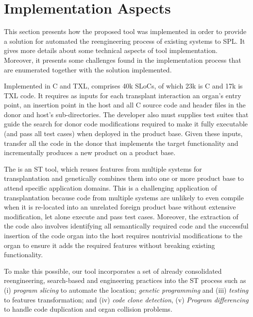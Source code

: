 \section{Implementation Aspects} 
\label{sec:implementation_aspects}

This section presents how the proposed tool was implemented in order to provide a solution for automated the reengineering process of existing systems to SPL. It gives more details about some technical aspects of \autoscalpel tool implementation. Moreover, it presents some challenges found in the implementation process that are enumerated together with the solution implemented.

Implemented in  C and TXL, \autoscalpel comprises 40k SLoCs, of which 23k is C and 17k is TXL code. It requires as inputs for each transplant interaction an organ’s entry point, an insertion point in the host and all C source code and header files in the donor and host's sub-directories. The developer also must supplies test suites that guide the search for donor code modifications required to make it fully executable (and pass all test cases) when deployed in the product base. Given these inputs, \autoscalpel transfer all the code in the donor that implements the target functionality and incrementally produces a new product on a product base. 

The \autoscalpel is an ST tool, which reuses features from multiple systems for transplantation and genetically combines them into one or more product base to attend specific application domains. This is a challenging application of transplantation because code from multiple systems are unlikely to even compile when it is re-located into an unrelated foreign product base without extensive modification, let alone execute and pass test cases. Moreover, the extraction of the code also involves identifying all semantically required code and the successful insertion of the code organ into the host requires nontrivial modifications to the organ to ensure it adds the required features without breaking existing functionality.  

To make this possible, our tool incorporates a set of already consolidated reengineering, search-based and engineering practices into the ST process such as (i) \emph{program slicing} \cite{Binkley:2014:OLP:2635868.2635893} to automate the location; \emph{genetic programming} and (iii) \emph{testing}  to features transformation; and (iv) \emph{code clone detection}, (v) \emph{Program differencing} to handle code duplication and organ collision problems.

